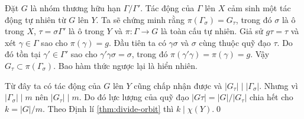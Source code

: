 Đặt $G$ là nhóm thương hữu hạn $\Gamma/\Gamma'$. Tác động của $\Gamma$ lên $X$ cảm sinh một tác động tự nhiên từ $G$ lên $Y$. Ta sẽ chứng minh rằng $\pi(\Gamma_\sigma) = G_\tau$, trong đó $\sigma$ là ô trong $X$, $\tau = \sigma \Gamma'$ là ô trong $Y$ và $\pi: \Gamma \rightarrow G$ là toàn cấu tự nhiên. Giả sử $g \tau = \tau$ và xét $\gamma \in \Gamma$ sao cho $\pi(\gamma) = g$. Đầu tiên ta có $\gamma \sigma$ và $\sigma$ cùng thuộc quỹ đạo $\tau$. Do đó tồn tại $\gamma' \in \Gamma'$ sao cho $\gamma' \gamma \sigma = \sigma$, trong đó $\pi(\gamma' \gamma) = \pi(\gamma) = g$. Vậy $G_\tau \subset \pi(\Gamma_\sigma)$. Bao hàm thức ngược lại là hiển nhiên.

Từ đây ta có tác động của $G$ lên $Y$ cũng chấp nhận được và $|G_\tau| \mid |\Gamma_\sigma|$. Nhưng vì $|\Gamma_\sigma| \mid m$ nên $|G_\tau| \mid m$. Do đó lực lượng của quỹ đạo $|G\tau| = |G| / |G_\tau|$ chia hết cho $k = |G|/m$. Theo Định lí \ref{thm:divide-orbit} thì $k \mid \chi(Y)$.\qed






